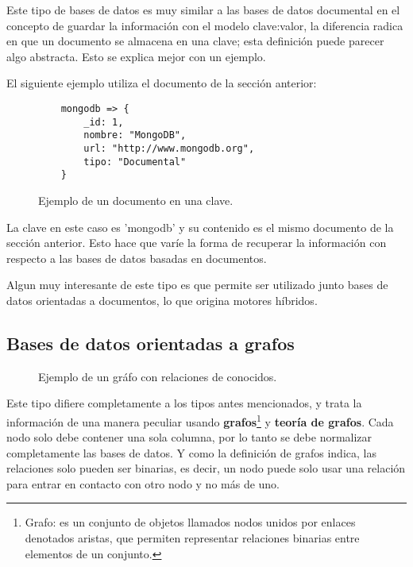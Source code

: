 Este tipo de bases de datos es muy similar a las bases de datos documental en el concepto de guardar la informaci\'on con el modelo clave:valor, la diferencia radica en que un documento se almacena en una clave; esta definici\'on puede parecer algo abstracta. Esto se explica mejor con un ejemplo.

El siguiente ejemplo utiliza el documento de la secci\'on anterior:

\begin{figure}[!ht]
    \centering
    \begin{lstlisting}
    mongodb => {
	    _id: 1,
	    nombre: "MongoDB",
	    url: "http://www.mongodb.org",
	    tipo: "Documental"
    }
    \end{lstlisting}
    \caption[Bases de datos clave/valor]{Ejemplo de un documento en una clave.}
\end{figure}

La clave en este caso es 'mongodb' y su contenido es el mismo documento de la secci\'on anterior. Esto hace que var\'ie la forma de recuperar la informaci\'on con respecto a las bases de datos basadas en documentos.

Algun muy interesante de este tipo es que permite ser utilizado junto bases de datos orientadas a documentos, lo que origina motores h\'ibridos.

\subsection{Bases de datos orientadas a grafos}

\begin{figure}[!h]
    \centering
     \caption[Bases de datos en grafo]{Ejemplo de un gr\'afo con relaciones de conocidos.}
\end{figure}

Este tipo difiere completamente a los tipos antes mencionados, y trata la informaci\'on de una manera peculiar usando \textbf{grafos}\footnote{Grafo: es un conjunto de objetos llamados nodos unidos por enlaces denotados aristas, que permiten representar relaciones binarias entre elementos de un conjunto.} y \textbf{teor\'ia de grafos}. Cada nodo solo debe contener una sola columna, por lo tanto se debe normalizar completamente las bases de datos. Y como la definici\'on de grafos indica, las relaciones solo pueden ser binarias, es decir, un nodo puede solo usar una relaci\'on para entrar en contacto con otro nodo y no m\'as de uno.

